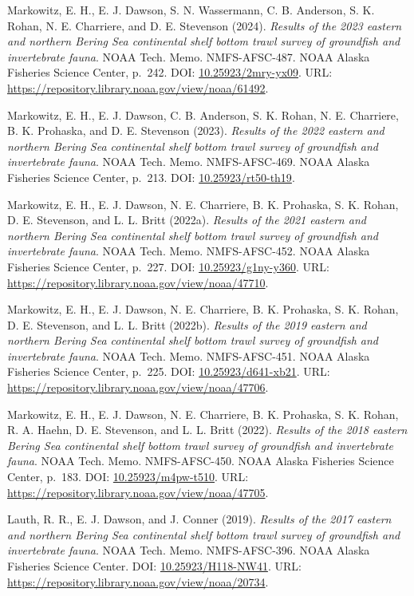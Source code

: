 \documentclass[
  letterpaper,
  oneside,
  open=any]{scrbook}
\begin{document}
Markowitz, E. H., E. J. Dawson, S. N. Wassermann, C. B. Anderson, S. K.
Rohan, N. E. Charriere, and D. E. Stevenson (2024). \emph{Results of the
2023 eastern and northern Bering Sea continental shelf bottom trawl
survey of groundfish and invertebrate fauna}. NOAA Tech. Memo.
NMFS-AFSC-487. NOAA Alaska Fisheries Science Center, p.~242. DOI:
\href{https://doi.org/10.25923\%2F2mry-yx09}{10.25923/2mry-yx09}. URL:
\url{https://repository.library.noaa.gov/view/noaa/61492}.

Markowitz, E. H., E. J. Dawson, C. B. Anderson, S. K. Rohan, N. E.
Charriere, B. K. Prohaska, and D. E. Stevenson (2023). \emph{Results of
the 2022 eastern and northern Bering Sea continental shelf bottom trawl
survey of groundfish and invertebrate fauna}. NOAA Tech. Memo.
NMFS-AFSC-469. NOAA Alaska Fisheries Science Center, p.~213. DOI:
\href{https://doi.org/10.25923\%2Frt50-th19}{10.25923/rt50-th19}.

Markowitz, E. H., E. J. Dawson, N. E. Charriere, B. K. Prohaska, S. K.
Rohan, D. E. Stevenson, and L. L. Britt (2022a). \emph{Results of the
2021 eastern and northern Bering Sea continental shelf bottom trawl
survey of groundfish and invertebrate fauna}. NOAA Tech. Memo.
NMFS-AFSC-452. NOAA Alaska Fisheries Science Center, p.~227. DOI:
\href{https://doi.org/10.25923\%2Fg1ny-y360}{10.25923/g1ny-y360}. URL:
\url{https://repository.library.noaa.gov/view/noaa/47710}.

Markowitz, E. H., E. J. Dawson, N. E. Charriere, B. K. Prohaska, S. K.
Rohan, D. E. Stevenson, and L. L. Britt (2022b). \emph{Results of the
2019 eastern and northern Bering Sea continental shelf bottom trawl
survey of groundfish and invertebrate fauna}. NOAA Tech. Memo.
NMFS-AFSC-451. NOAA Alaska Fisheries Science Center, p.~225. DOI:
\href{https://doi.org/10.25923\%2Fd641-xb21}{10.25923/d641-xb21}. URL:
\url{https://repository.library.noaa.gov/view/noaa/47706}.

Markowitz, E. H., E. J. Dawson, N. E. Charriere, B. K. Prohaska, S. K.
Rohan, R. A. Haehn, D. E. Stevenson, and L. L. Britt (2022).
\emph{Results of the 2018 eastern Bering Sea continental shelf bottom
trawl survey of groundfish and invertebrate fauna}. NOAA Tech. Memo.
NMFS-AFSC-450. NOAA Alaska Fisheries Science Center, p.~183. DOI:
\href{https://doi.org/10.25923\%2Fm4pw-t510}{10.25923/m4pw-t510}. URL:
\url{https://repository.library.noaa.gov/view/noaa/47705}.

Lauth, R. R., E. J. Dawson, and J. Conner (2019). \emph{Results of the
2017 eastern and northern Bering Sea continental shelf bottom trawl
survey of groundfish and invertebrate fauna}. NOAA Tech. Memo.
NMFS-AFSC-396. NOAA Alaska Fisheries Science Center. DOI:
\href{https://doi.org/10.25923\%2FH118-NW41}{10.25923/H118-NW41}. URL:
\url{https://repository.library.noaa.gov/view/noaa/20734}.
\end{document}
